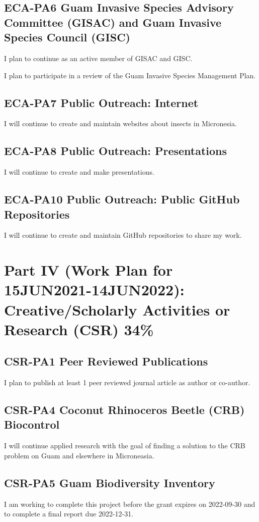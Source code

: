 \subsection{ECA-PA6 Guam Invasive Species Advisory Committee (GISAC) and Guam Invasive Species Council (GISC)}
I plan to continue as an active member of GISAC and GISC.

I plan to participate in a review of the Guam Invasive Species Management Plan.

\subsection{ECA-PA7 Public Outreach: Internet}
I will continue to create and maintain websites about insects in Micronesia.

\subsection{ECA-PA8 Public Outreach: Presentations}
I will continue to create and make presentations.

\subsection{ECA-PA10 Public Outreach: Public GitHub Repositories}
I will continue to create and maintain GitHub repositories to share my work.

\section{Part IV (Work Plan for 15JUN2021-14JUN2022): Creative/Scholarly Activities or Research (CSR) 34\%}

\subsection{CSR-PA1 Peer Reviewed Publications} 
I plan to publish at least 1 peer reviewed journal article as author or co-author.

\subsection{CSR-PA4 Coconut Rhinoceros Beetle (CRB) Biocontrol}

I will continue applied research with the goal of finding a solution to the CRB problem on Guam and elsewhere in Microneasia. 

\subsection{CSR-PA5 Guam Biodiversity Inventory}I am working to complete this project before the grant expires on 2022-09-30 and to complete a final report due 2022-12-31.

